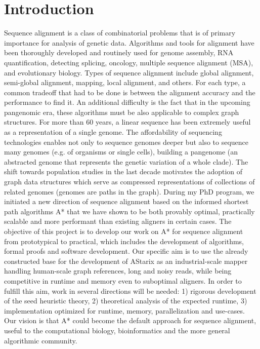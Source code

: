 \chapter{Introduction}

\graphicspath{{\dir/}}


Sequence alignment is a class of combinatorial problems that is of primary
importance for analysis of genetic data. Algorithms and tools for alignment have
been thoroughly developed and routinely used for genome assembly, RNA
quantification, detecting splicing, oncology, multiple sequence alignment (MSA),
and evolutionary biology. Types of sequence alignment include global alignment,
semi-global alignment, mapping, local alignment, and others. For each type, a
common tradeoff that had to be done is between the alignment accuracy and the
performance to find it. An additional difficulty is the fact that in the
upcoming pangenomic era, these algorithms must be also applicable to complex
graph structures. For more than 60 years, a linear sequence has been extremely
useful as a representation of a single genome. The affordability of sequencing
technologies enables not only to sequence genomes deeper but also to sequence
many genomes (e.g. of organisms or single cells), building a pangenome (an
abstracted genome that represents the genetic variation of a whole clade). The
shift towards population studies in the last decade motivates the adoption of
graph data structures which serve as compressed representations of collections
of related genomes (genomes are paths in the graph). During my PhD program, we
initiated a new direction of sequence alignment based on the informed shortest
path algorithms A* that we have shown to be both provably optimal, practically
scalable and more performant than existing aligners in certain cases. The
objective of this project is to develop our work on A* for sequence alignment
from prototypical to practical, which includes the development of algorithms,
formal proofs and software development. Our specific aim is to use the already
constructed base for the development of AStarix as an industrial-scale mapper
handling human-scale graph references, long and noisy reads, while being
competitive in runtime and memory even to suboptimal aligners. In order to
fulfill this aim, work in several directions will be needed: 1) rigorous
development of the seed heuristic theory, 2) theoretical analysis of the
expected runtime, 3) implementation optimized for runtime, memory,
parallelization and use-cases. Our vision is that A* could become the default
approach for sequence alignment, useful to the computational biology,
bioinformatics and the more general algorithmic community.

